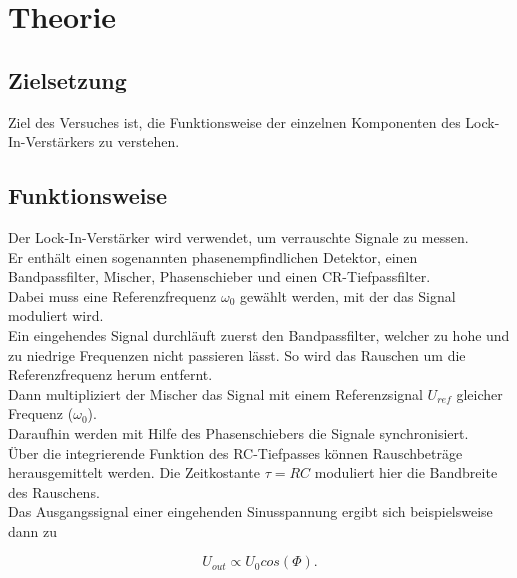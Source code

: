 \section{Theorie}
\label{sec:Theorie}

\cite{sample}

\subsection{Zielsetzung}
\label{subsec:Zielsetzung}

Ziel des Versuches ist, die Funktionsweise der einzelnen Komponenten des Lock-In-Verstärkers
zu verstehen.\\


\subsection{Funktionsweise}
\label{subsec:Funktionsweise}

Der Lock-In-Verstärker wird verwendet, um verrauschte Signale zu messen. \\
Er enthält einen sogenannten phasenempfindlichen Detektor, einen Bandpassfilter, Mischer, 
Phasenschieber und einen CR-Tiefpassfilter.\\
Dabei muss eine Referenzfrequenz $\omega_0$ gewählt werden, mit der das Signal moduliert wird.\\


Ein eingehendes Signal durchläuft zuerst den Bandpassfilter, welcher zu hohe und zu niedrige 
Frequenzen nicht passieren lässt. So wird das Rauschen um die Referenzfrequenz herum
entfernt. \\
Dann multipliziert der Mischer das Signal mit einem Referenzsignal 
$U_{ref}$ gleicher Frequenz ($\omega_0$).\\
Daraufhin werden mit Hilfe des Phasenschiebers die Signale synchronisiert.\\
Über die integrierende Funktion des RC-Tiefpasses können Rauschbeträge herausgemittelt werden.
Die Zeitkostante $\tau = RC$ moduliert hier die Bandbreite des Rauschens. \\
Das Ausgangssignal einer eingehenden Sinusspannung ergibt sich beispielsweise
dann zu 

\begin{equation*}
    U_{out} \propto U_0 cos( \Phi).
\end{equation*}


